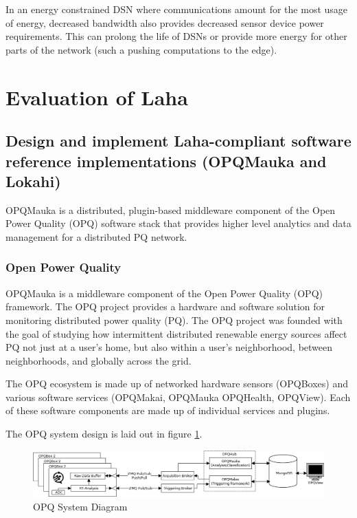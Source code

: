 In an energy constrained DSN where communications amount for the most usage of energy, decreased bandwidth also provides decreased sensor device power requirements. This can prolong the life of DSNs or provide more energy for other parts of the network (such a pushing computations to the edge).

\section{Evaluation of Laha}
\subsection{Design and implement Laha-compliant software reference implementations (OPQMauka and Lokahi)}
OPQMauka is a distributed, plugin-based middleware component of the Open Power Quality (OPQ) software stack that provides higher level analytics and data management for a distributed PQ network.

\subsubsection{Open Power Quality}
OPQMauka is a middleware component of the Open Power Quality (OPQ) framework. The OPQ project provides a hardware and software solution for monitoring distributed power quality (PQ). The OPQ project was founded with the goal of studying how intermittent distributed renewable energy sources affect PQ not just at a user's home, but also within a user's neighborhood, between neighborhoods, and globally across the grid. 

The OPQ ecosystem is made up of networked hardware sensors (OPQBoxes) and various software services (OPQMakai, OPQMauka OPQHealth, OPQView). Each of these software components are made up of individual services and plugins.

The OPQ system design is laid out in figure \ref{fig:opq-system}.

\begin{figure}
	\centering
	\includegraphics[width=\linewidth]{figures/system-diagram.png}
	\caption{OPQ System Diagram}\label{fig:opq-system}
\end{figure}

